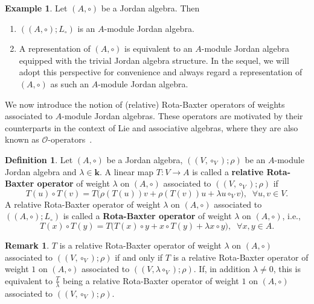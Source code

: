 \documentclass[12pt, reqno, a4paper]{amsart}
\theoremstyle{definition}
\newtheorem{definition}[theorem]{Definition}
\newtheorem{example}[theorem]{Example}
\newtheorem{remark}[theorem]{Remark}
\begin{document}
\begin{example}
	Let $(A, \circ)$ be a Jordan algebra. 
	Then
	\begin{enumerate}
		\item[(i)]
		    $((A, \circ); L_{\circ})$ is an $A$-module Jordan algebra.

		\item[(ii)]
		    A representation of $(A, \circ)$ is equivalent to an $A$-module Jordan algebra equipped with the trivial Jordan algebra structure.
		    In the sequel, we will adopt this perspective for convenience and always regard a representation of $(A, \circ)$ as such an $A$-module Jordan algebra.
	\end{enumerate}
\end{example}



We now introduce the notion of (relative) Rota-Baxter operators of weights associated to $A$-module Jordan algebras.
These operators are motivated by their counterparts in the context of Lie and associative algebras, where they are also known as $\mathcal{O}$-operators~\cite{bai2010double, bai2010nonabelian, bai2012O, kupershmidt1999classical}.


\begin{definition}\label{def:oo}
	Let $(A, \circ)$ be a Jordan algebra, $((V, \circ_V); \rho)$ be an $A$-module Jordan algebra and $\lambda \in \mathbf{k}$.
	A linear map $T: V \to A$ is called a \textbf{relative Rota-Baxter operator} of weight $\lambda$ on $(A, \circ)$ associated to $((V, \circ_V); \rho)$ if
	\begin{equation*}
		T(u) \circ T(v) = T\big( \rho(T(u))v + \rho(T(v))u + \lambda u \circ_V v \big), \;\; \forall u, v \in V.
	\end{equation*}
	A relative Rota-Baxter operator of weight $\lambda$ on $(A, \circ)$ associated to $((A, \circ); L_{\circ})$ is called a {\bf Rota-Baxter operator} of weight $\lambda$ on $(A, \circ)$, i.e.,
	\begin{equation*}
		T(x) \circ T(y) = T\big( T(x) \circ y + x \circ T(y) + \lambda x \circ y \big), \;\; \forall x, y \in A.
	\end{equation*}
\end{definition}



\begin{remark}
	$T$ is a relative Rota-Baxter operator of weight $\lambda$ on $(A, \circ)$ associated to $((V, \circ_V); \rho)$ if and only if $T$ is a relative Rota-Baxter operator of weight $1$ on $(A, \circ)$ associated to $((V, \lambda \circ_V); \rho)$.
	If, in addition $\lambda \neq 0$, this is equivalent to $\frac{T}{\lambda}$ being a relative Rota-Baxter operator of weight $1$ on $(A, \circ)$ associated to $((V, \circ_V); \rho)$.
\end{remark}
\end{document}
